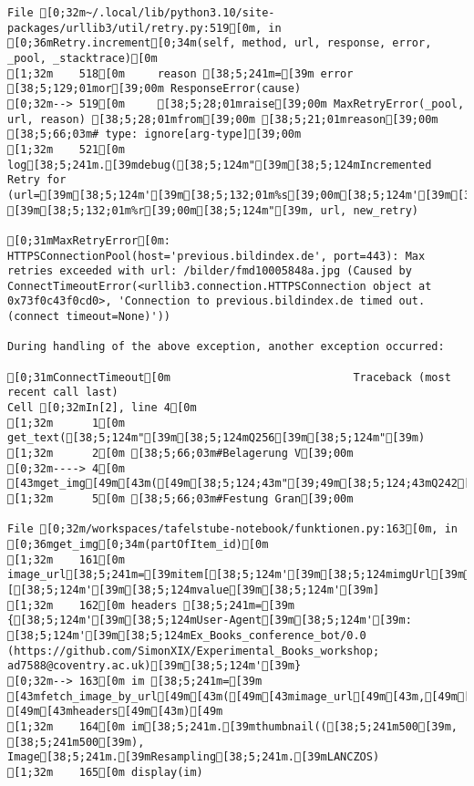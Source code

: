 \documentclass[
  a4paper,
  portrait]{book}
\begin{document}
\begin{verbatim}
File [0;32m~/.local/lib/python3.10/site-packages/urllib3/util/retry.py:519[0m, in [0;36mRetry.increment[0;34m(self, method, url, response, error, _pool, _stacktrace)[0m
[1;32m    518[0m     reason [38;5;241m=[39m error [38;5;129;01mor[39;00m ResponseError(cause)
[0;32m--> 519[0m     [38;5;28;01mraise[39;00m MaxRetryError(_pool, url, reason) [38;5;28;01mfrom[39;00m [38;5;21;01mreason[39;00m  [38;5;66;03m# type: ignore[arg-type][39;00m
[1;32m    521[0m log[38;5;241m.[39mdebug([38;5;124m"[39m[38;5;124mIncremented Retry for (url=[39m[38;5;124m'[39m[38;5;132;01m%s[39;00m[38;5;124m'[39m[38;5;124m): [39m[38;5;132;01m%r[39;00m[38;5;124m"[39m, url, new_retry)

[0;31mMaxRetryError[0m: HTTPSConnectionPool(host='previous.bildindex.de', port=443): Max retries exceeded with url: /bilder/fmd10005848a.jpg (Caused by ConnectTimeoutError(<urllib3.connection.HTTPSConnection object at 0x73f0c43f0cd0>, 'Connection to previous.bildindex.de timed out. (connect timeout=None)'))

During handling of the above exception, another exception occurred:

[0;31mConnectTimeout[0m                            Traceback (most recent call last)
Cell [0;32mIn[2], line 4[0m
[1;32m      1[0m get_text([38;5;124m"[39m[38;5;124mQ256[39m[38;5;124m"[39m)
[1;32m      2[0m [38;5;66;03m#Belagerung V[39;00m
[0;32m----> 4[0m [43mget_img[49m[43m([49m[38;5;124;43m"[39;49m[38;5;124;43mQ242[39;49m[38;5;124;43m"[39;49m[43m)[49m
[1;32m      5[0m [38;5;66;03m#Festung Gran[39;00m

File [0;32m/workspaces/tafelstube-notebook/funktionen.py:163[0m, in [0;36mget_img[0;34m(partOfItem_id)[0m
[1;32m    161[0m image_url[38;5;241m=[39mitem[[38;5;124m'[39m[38;5;124mimgUrl[39m[38;5;124m'[39m][[38;5;124m'[39m[38;5;124mvalue[39m[38;5;124m'[39m]
[1;32m    162[0m headers [38;5;241m=[39m {[38;5;124m'[39m[38;5;124mUser-Agent[39m[38;5;124m'[39m: [38;5;124m'[39m[38;5;124mEx_Books_conference_bot/0.0 (https://github.com/SimonXIX/Experimental_Books_workshop; ad7588@coventry.ac.uk)[39m[38;5;124m'[39m}
[0;32m--> 163[0m im [38;5;241m=[39m [43mfetch_image_by_url[49m[43m([49m[43mimage_url[49m[43m,[49m[43m [49m[43mheaders[49m[43m)[49m
[1;32m    164[0m im[38;5;241m.[39mthumbnail(([38;5;241m500[39m, [38;5;241m500[39m), Image[38;5;241m.[39mResampling[38;5;241m.[39mLANCZOS)
[1;32m    165[0m display(im)


\end{verbatim}
\end{document}
